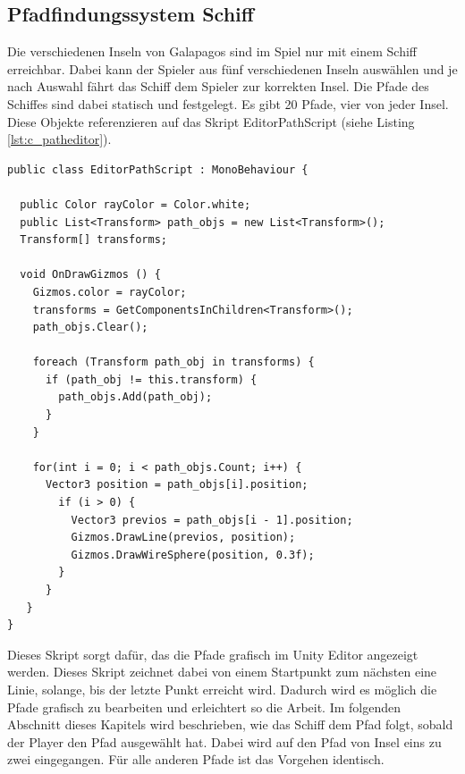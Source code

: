 		\subsection{Pfadfindungssystem Schiff}
			Die verschiedenen Inseln von Galapagos sind im Spiel nur mit einem Schiff erreichbar. Dabei kann der Spieler aus fünf verschiedenen Inseln auswählen und je nach Auswahl fährt das Schiff dem Spieler zur korrekten Insel. Die Pfade des Schiffes sind dabei statisch und festgelegt. Es gibt 20 Pfade, vier von jeder Insel. Diese Objekte referenzieren auf das Skript EditorPathScript (siehe Listing \ref{lst:c_patheditor}).

\begin{scriptsize}
\lstset{
	float,
	caption=Skript: EditorPathScript.cs, 
	language=[Sharp]C, 
	frame=single,  
	showstringspaces=false, 
	showspaces=false, 
	numbers=left, 
	captionpos=b, 
	belowcaptionskip=4pt,
	basicstyle=\ttfamily
} 
\begin{lstlisting}[label=lst:c_patheditor]
public class EditorPathScript : MonoBehaviour {

  public Color rayColor = Color.white;
  public List<Transform> path_objs = new List<Transform>();
  Transform[] transforms;

  void OnDrawGizmos () {
    Gizmos.color = rayColor;
    transforms = GetComponentsInChildren<Transform>();
    path_objs.Clear();

    foreach (Transform path_obj in transforms) {
      if (path_obj != this.transform) {
        path_objs.Add(path_obj);
      }
    }

    for(int i = 0; i < path_objs.Count; i++) {
      Vector3 position = path_objs[i].position;
        if (i > 0) {
          Vector3 previos = path_objs[i - 1].position;
          Gizmos.DrawLine(previos, position);
          Gizmos.DrawWireSphere(position, 0.3f);
        }
      }
   }
}
\end{lstlisting}
\end{scriptsize}

			Dieses Skript sorgt dafür, das die Pfade grafisch im Unity Editor angezeigt werden. Dieses Skript zeichnet dabei von einem Startpunkt zum nächsten eine Linie, solange, bis der letzte Punkt erreicht wird. Dadurch wird es möglich die Pfade grafisch zu bearbeiten und erleichtert so die Arbeit. Im folgenden Abschnitt dieses Kapitels wird beschrieben, wie das Schiff dem Pfad folgt, sobald der Player den Pfad ausgewählt hat. Dabei wird auf den Pfad von Insel eins zu zwei eingegangen. Für alle anderen Pfade ist das Vorgehen identisch.

